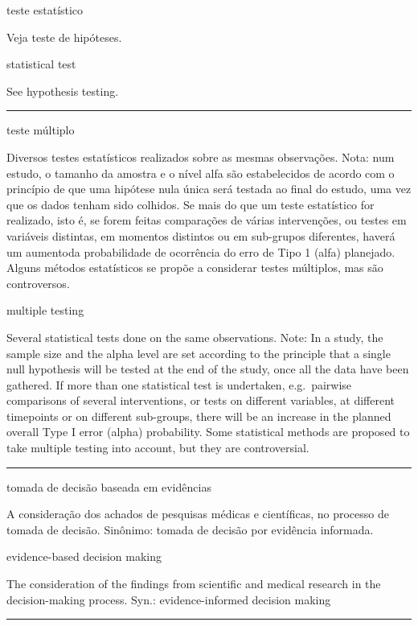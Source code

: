 \documentclass[
  openany]{book}
\begin{document}
teste estatístico

Veja teste de hipóteses.

statistical test

See hypothesis testing.

\begin{center}\rule{0.5\linewidth}{0.5pt}\end{center}

teste múltiplo

Diversos testes estatísticos realizados sobre as mesmas observações. Nota: num estudo, o tamanho da amostra e o nível alfa são estabelecidos de acordo com o princípio de que uma hipótese nula única será testada ao final do estudo, uma vez que os dados tenham sido colhidos. Se mais do que um teste estatístico for realizado, isto é, se forem feitas comparações de várias intervenções, ou testes em variáveis distintas, em momentos distintos ou em sub-grupos diferentes, haverá um aumentoda probabilidade de ocorrência do erro de Tipo 1 (alfa) planejado. Alguns métodos estatísticos se propõe a considerar testes múltiplos, mas são controversos.

multiple testing

Several statistical tests done on the same observations. Note: In a study, the sample size and the alpha level are set according to the principle that a single null hypothesis will be tested at the end of the study, once all the data have been gathered. If more than one statistical test is undertaken, e.g.~pairwise comparisons of several interventions, or tests on different variables, at different timepoints or on different sub-groups, there will be an increase in the planned overall Type I error (alpha) probability. Some statistical methods are proposed to take multiple testing into account, but they are controversial.

\begin{center}\rule{0.5\linewidth}{0.5pt}\end{center}

tomada de decisão baseada em evidências

A consideração dos achados de pesquisas médicas e científicas, no processo de tomada de decisão. Sinônimo: tomada de decisão por evidência informada.

evidence-based decision making

The consideration of the findings from scientific and medical research in the decision-making process. Syn.: evidence-informed decision making

\begin{center}\rule{0.5\linewidth}{0.5pt}\end{center}
\end{document}
